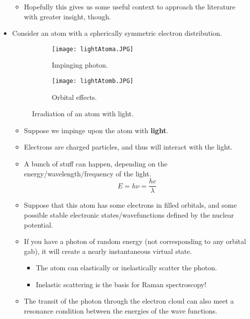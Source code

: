 \documentclass[../notes.tex]{subfiles}
\begin{document}
\begin{itemize}
\begin{itemize}
        \item Hopefully this gives us some useful context to approach the literature with greater insight, though.
    \end{itemize}
    \item Consider an atom with a spherically symmetric electron distribution.
    \begin{figure}[H]
        \centering
        \begin{subfigure}[b]{0.42\linewidth}
            \centering
            \texttt{[image: lightAtoma.JPG]}
            \caption{Impinging photon.}
            \label{fig:lightAtoma}
        \end{subfigure}
        \begin{subfigure}[b]{0.42\linewidth}
            \centering
            \texttt{[image: lightAtomb.JPG]}
            \caption{Orbital effects.}
            \label{fig:lightAtomb}
        \end{subfigure}
        \caption{Irradiation of an atom with light.}
        \label{fig:lightAtom}
    \end{figure}
    \begin{itemize}
        \item Suppose we impinge upon the atom with \textbf{light}.
        \item Electrons are charged particles, and thus will interact with the light.
        \item A bunch of stuff can happen, depending on the energy/wavelength/frequency of the light.
        \begin{equation*}
            E = h\nu
            = \frac{hc}{\lambda}
        \end{equation*}
        \item Suppose that this atom has some electrons in filled orbitals, and some possible stable electronic states/wavefunctions defined by the nuclear potential.
        \item If you have a photon of random energy (not corresponding to any orbital gab), it will create a nearly instantaneous virtual state.
        \begin{itemize}
            \item The atom can elastically or inelastically scatter the photon.
            \item Inelastic scattering is the basis for Raman spectroscopy!
        \end{itemize}
        \item The transit of the photon through the electron cloud can also meet a resonance condition between the energies of the wave functions.

\end{itemize}
\end{itemize}
\end{document}
